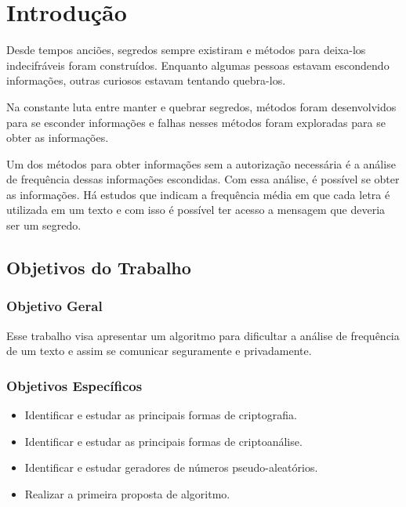 \chapter{Introdução}
\label{introduction}

Desde tempos anciões, segredos sempre existiram e métodos para deixa-los indecifráveis foram construídos. Enquanto algumas pessoas estavam escondendo informações, outras curiosos estavam tentando quebra-los. ~\cite{alexander-maximov}

Na constante luta entre manter e quebrar segredos, métodos foram desenvolvidos para se esconder informações e falhas nesses métodos foram exploradas para se obter as informações.

Um dos métodos para obter informações sem a autorização necessária é a análise de frequência dessas informações escondidas. Com essa análise, é possível se obter as informações. Há estudos que indicam a frequência média em que cada letra é utilizada em um texto e com isso é possível ter acesso a mensagem que deveria ser um segredo. 

\section{Objetivos do Trabalho}
\label{paper-objectives}

\subsection{Objetivo Geral}
\label{general-objective}
Esse trabalho visa apresentar um algoritmo para dificultar a análise de frequência de um texto e  assim se comunicar seguramente e privadamente.

\subsection{Objetivos Específicos}
\label{specifics-objectives}

\begin{itemize}
	\item Identificar e estudar as principais formas de criptografia.
	\item Identificar e estudar as principais formas de criptoanálise.
	\item Identificar e estudar geradores de números pseudo-aleatórios.
	\item Realizar a primeira proposta de algoritmo.
\end{itemize}

